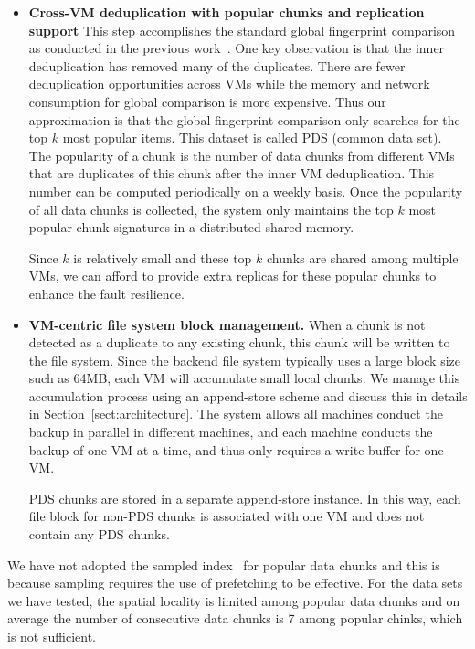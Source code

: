 \begin{itemize}
\item \textbf{Cross-VM deduplication with popular chunks and replication support}
This step accomplishes the standard global fingerprint comparison as conducted
in the previous work~\cite{WeiZhangIEEE}.
One key observation is that the inner deduplication has removed many of the duplicates.
There are fewer deduplication opportunities across VMs while the memory and network
consumption for global comparison is more expensive.
Thus our approximation is that the global fingerprint comparison only searches for the top $k$
most popular items. This dataset is called PDS (common data set). 
The popularity of a chunk is the number  of data chunks  from different VMs
that are duplicates of this chunk after the inner VM deduplication.
This number can be computed periodically on a weekly basis.
Once the popularity of all data chunks is collected, the system only maintains the top $k$
most popular chunk signatures in a distributed shared memory.  

Since $k$ is relatively small and these top $k$ chunks are shared among multiple VMs, 
we can afford to provide extra replicas for these popular chunks to enhance the fault resilience.

\item \textbf{VM-centric file system block management.}
When a chunk is not detected as a duplicate to any existing chunk, this chunk will be written
to the file system. Since the backend file system typically uses a large block size such as 64MB, each VM will 
accumulate small local chunks. We manage this accumulation process using an append-store  scheme
and discuss this in details in Section~\ref{sect:architecture}.
The system allows all machines conduct the backup in parallel in different machines, and each machine
conducts the backup of one VM at a time, and thus only requires a write  buffer for one VM.

PDS chunks are stored in a separate append-store instance. In this way, each
file block for non-PDS chunks is associated with one VM and does not contain
any PDS chunks. 
\end{itemize}

We have not  adopted the  sampled index~\cite{Guo2011} 
for  popular data chunks and  this is because sampling requires the use of prefetching to be effective.
For the data sets we have tested, the spatial locality is limited among popular
data chunks and  on average the number of consecutive data chunks is 7 among popular chinks, which is not sufficient.

